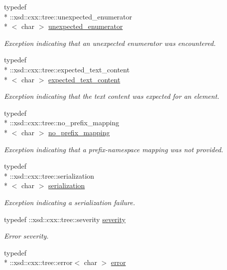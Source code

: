 \begin{DoxyCompactItemize}
typedef \\*
\+::xsd\+::cxx\+::tree\+::unexpected\+\_\+enumerator\\*
$<$ char $>$ \hyperlink{namespacexml__schema_aa088274f605e06cd53d9062265b5229c}{unexpected\+\_\+enumerator}
\begin{DoxyCompactList}\small\item\em Exception indicating that an unexpected enumerator was encountered. \end{DoxyCompactList}\item 
typedef \\*
\+::xsd\+::cxx\+::tree\+::expected\+\_\+text\+\_\+content\\*
$<$ char $>$ \hyperlink{namespacexml__schema_a1994323b3f5fee8db7891f02bb9144b9}{expected\+\_\+text\+\_\+content}
\begin{DoxyCompactList}\small\item\em Exception indicating that the text content was expected for an element. \end{DoxyCompactList}\item 
typedef \\*
\+::xsd\+::cxx\+::tree\+::no\+\_\+prefix\+\_\+mapping\\*
$<$ char $>$ \hyperlink{namespacexml__schema_a03293581f2c90a05fbb910be49380e01}{no\+\_\+prefix\+\_\+mapping}
\begin{DoxyCompactList}\small\item\em Exception indicating that a prefix-\/namespace mapping was not provided. \end{DoxyCompactList}\item 
typedef \\*
\+::xsd\+::cxx\+::tree\+::serialization\\*
$<$ char $>$ \hyperlink{namespacexml__schema_a40e04a11c9e6204762591b4de3755899}{serialization}
\begin{DoxyCompactList}\small\item\em Exception indicating a serialization failure. \end{DoxyCompactList}\item 
typedef \+::xsd\+::cxx\+::tree\+::severity \hyperlink{namespacexml__schema_aaac8e21420b35e58ad94533db40ccf41}{severity}
\begin{DoxyCompactList}\small\item\em Error severity. \end{DoxyCompactList}\item 
typedef \\*
\+::xsd\+::cxx\+::tree\+::error$<$ char $>$ \hyperlink{namespacexml__schema_a13e2122658f2abee3c2da9829f2de129}{error}

\end{DoxyCompactItemize}
